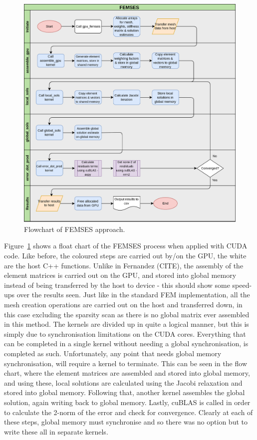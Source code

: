 \begin{figure}
	\centering
	\includegraphics[width=0.9\linewidth]{Figures/femses_flow}
	\caption{Flowchart of FEMSES approach.}
	\label{fig:femsesflow}
\end{figure}

Figure~\ref{fig:femsesflow} shows a float chart of the FEMSES process when applied with CUDA code. Like before, the coloured steps are carried out by/on the GPU, the white are the host C++ functions. Unlike in Fernandez (CITE), the assembly of the element matrices is carried out on the GPU, and stored into global memory instead of being transferred by the host to device - this should show some speed-ups over the results seen. Just like in the standard FEM implementation, all the mesh creation operations are carried out on the host and transferred down, in this case excluding the sparsity scan as there is no global matrix ever assembled in this method. The kernels are divided up in quite a logical manner, but this is simply due to synchronisation limitations on the CUDA cores. Everything that can be completed in a single kernel without needing a global synchronisation, is completed as such. Unfortunately, any point that needs global memory synchronisation, will require a kernel to terminate. This can be seen in the flow chart, where the element matrices are assembled and stored into global memory, and using these, local solutions are calculated using the Jacobi relaxation and stored into global memory. Following that, another kernel assembles the global solution, again writing back to global memory. Lastly, cuBLAS is called in order to calculate the 2-norm of the error and check for convergence. Clearly at each of these steps, global memory must synchronise and so there was no option but to write these all in separate kernels.

